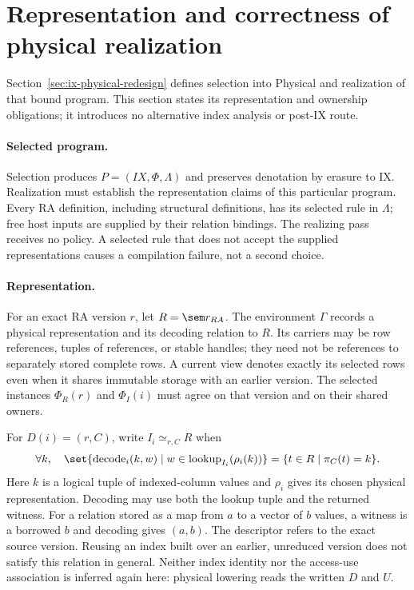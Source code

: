 \section{Representation and correctness of physical realization}
\label{sec:physical}
Section~\ref{sec:ix-physical-redesign} defines selection into Physical and
realization of that bound program.
This section states its representation and ownership obligations; it introduces
no alternative index analysis or post-IX route.

\paragraph{Selected program.}
Selection produces $P=(IX,\Phi,\Lambda)$ and preserves denotation by erasure
to IX. Realization must establish the representation claims of this particular
program. Every RA definition, including structural definitions, has its selected
rule in $\Lambda$; free host inputs are supplied by their relation bindings.
The realizing pass receives no policy. A selected rule that does not accept
the supplied representations causes a compilation failure, not a second choice.

\paragraph{Representation.}
For an exact RA version $r$, let $R=\sem r_{RA}$. The environment $\Gamma$
records a physical representation and its decoding relation to $R$.
Its carriers may be row references, tuples of references, or stable handles;
they need not be references to separately stored complete rows. A current view
denotes exactly its selected rows even when it shares immutable storage with
an earlier version. The selected instances $\Phi_R(r)$ and $\Phi_I(i)$ must
agree on that version and on their shared owners.

For $D(i)=(r,C)$, write $I_i\simeq_{r,C}R$ when
\[
 \forall k,\quad
 \set\{\operatorname{decode}_i(k,w)\mid
       w\in\operatorname{lookup}_{I_i}(\rho_i(k))\}
 =\{t\in R\mid\pi_C(t)=k\}.
\]
Here $k$ is a logical tuple of indexed-column values and $\rho_i$ gives its
chosen physical representation. Decoding may use both the lookup tuple and
the returned witness. For a relation stored as a map from $a$ to a vector of
$b$ values, a witness is a borrowed $b$ and decoding gives $(a,b)$.
The descriptor refers to the exact source version. Reusing an index built over
an earlier, unreduced version does not satisfy this relation in general.
Neither index identity nor the access-use association is inferred again here:
physical lowering reads the written $D$ and $U$.

